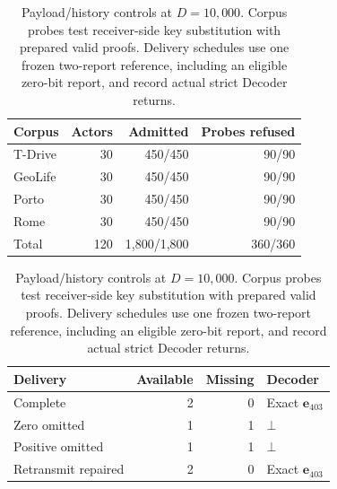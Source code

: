 \begin{table}[t]
\centering
\caption{Payload/history controls at \(D=10{,}000\). Corpus probes test
receiver-side key substitution with prepared valid proofs. Delivery schedules
use one frozen two-report reference, including an eligible zero-bit report,
and record actual strict Decoder returns.}
\label{tab:payload-history-conformance}
\footnotesize
\setlength{\tabcolsep}{3pt}
\begin{tabular}{@{}lrrr@{}}
\toprule
Corpus & Actors & Admitted & Probes refused \\
\midrule
T-Drive & 30 & 450/450 & 90/90 \\
GeoLife & 30 & 450/450 & 90/90 \\
Porto & 30 & 450/450 & 90/90 \\
Rome & 30 & 450/450 & 90/90 \\
\midrule
Total & 120 & 1,800/1,800 & 360/360 \\
\bottomrule
\end{tabular}
\par\smallskip
\begin{tabular}{@{}lrrl@{}}
\toprule
Delivery & Available & Missing & Decoder \\
\midrule
Complete & 2 & 0 & Exact \(\mathbf e_{403}\) \\
Zero omitted & 1 & 1 & \(\bot\) \\
Positive omitted & 1 & 1 & \(\bot\) \\
Retransmit repaired & 2 & 0 & Exact \(\mathbf e_{403}\) \\
\bottomrule
\end{tabular}
\end{table}
